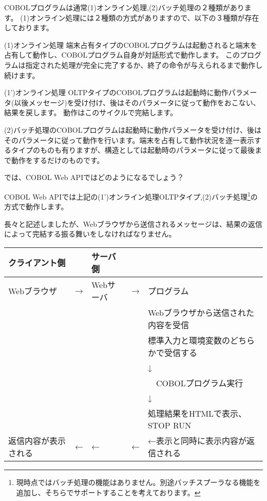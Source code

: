 COBOLプログラムは通常{\gt(1)オンライン処理,(2)バッチ処理}の２種類があります。
(1)オンライン処理には２種類の方式がありますので、以下の３種類が存在しております。

{\gt (1)オンライン処理 端末占有タイプ}のCOBOLプログラムは起動されると端末を占有して動作し、COBOLプログラム自身が対話形式で動作します。
このプログラムは指定された処理が完全に完了するか、終了の命令が与えられるまで動作し続けます。

{\gt (1')オンライン処理 OLTPタイプ}のCOBOLプログラムは起動時に動作パラメータ(以後メッセージ)を受け付け、後はそのパラメータに従って動作をおこない、結果を戻します。
動作はこのサイクルで完結します。

{\gt (2)バッチ処理}のCOBOLプログラムは起動時に動作パラメータを受け付け、後はそのパラメータに従って動作を行います。端末を占有して動作状況を逐一表示するタイプのものも有りますが、構造としては起動時のパラメータに従って最後まで動作をするだけのものです。

では、COBOL Web APIではどのようになるでしょう？

COBOL Web APIでは上記の{\gt(1')オンライン処理OLTPタイプ,(2)バッチ処理}\footnote{現時点ではバッチ処理の機能はありません。別途バッチスプーラなる機能を追加し、そちらでサポートすることを考えております。}の方式で動作します。


長々と記述しましたが、Webブラウザから送信されるメッセージは、結果の返信によって完結する振る舞いをしなければなりません。

\vspace{1em}
\begin{tabular}{|lllll|}
\hline
クライアント側 & & サーバ側 & & \\
\hline
Webブラウザ & → & Webサーバ & → & プログラム \\
            &    &           &    &  Webブラウザから送信された内容を受信 \\
            &    &           &    &  標準入力と環境変数のどちらかで受信する\\
            &    &           &    &       ↓ \\
            &    &           &    & 　COBOLプログラム実行\\
            &    &           &    &       ↓ \\
            &    &           &    &  処理結果をHTMLで表示、STOP RUN\\
返信内容が表示される& ← &  ←       &←  &  ←表示と同時に表示内容が返信される \\
\hline
\end{tabular}

